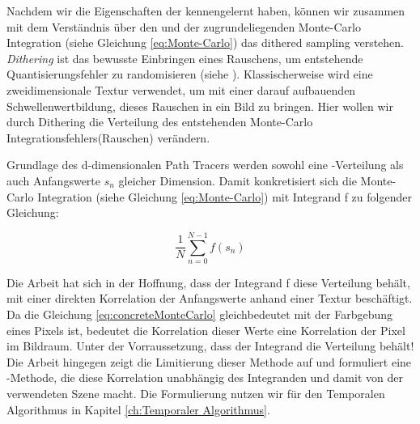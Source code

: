 \label{subsec:dither sampling}
Nachdem wir die Eigenschaften der  kennengelernt haben,
können wir zusammen mit dem Verständnis über den  und der 
zugrundeliegenden Monte-Carlo Integration (siehe Gleichung \ref{eq:Monte-Carlo}) das dithered sampling verstehen.
\textit{Dithering} ist das bewusste Einbringen eines Rauschens, um entstehende Quantisierungsfehler
zu randomisieren (siehe \cite{georgiev2016blue}).
Klassischerweise wird eine zweidimensionale 
 Textur verwendet, um mit einer darauf aufbauenden Schwellenwertbildung,
dieses Rauschen in ein Bild zu bringen. 
Hier wollen wir durch Dithering die Verteilung des 
entstehenden Monte-Carlo Integrationsfehlers(Rauschen) verändern.\par
Grundlage des d-dimensionalen Path Tracers werden sowohl eine 
-Verteilung als auch Anfangswerte $s_{n}$ gleicher Dimension.
Damit konkretisiert sich die Monte-Carlo Integration (siehe Gleichung \ref{eq:Monte-Carlo}) 
mit Integrand f zu folgender Gleichung:

\begin{equation}\label{eq:concreteMonteCarlo}
    \frac{1}{N}\sum_{n=0}^{N-1}f(s_{n})
\end{equation}

Die Arbeit \cite{georgiev2016blue} hat sich in der Hoffnung, dass der Integrand f diese
Verteilung behält, mit einer direkten Korrelation der Anfangswerte anhand einer 
 Textur beschäftigt. Da die Gleichung \ref{eq:concreteMonteCarlo}
gleichbedeutet mit der Farbgebung eines Pixels ist, bedeutet die Korrelation dieser Werte eine Korrelation 
der Pixel im Bildraum. Unter der Vorraussetzung, dass der Integrand die Verteilung behält!
Die Arbeit \cite{hal02158423} hingegen zeigt die Limitierung dieser Methode auf und formuliert 
eine -Methode, 
die diese Korrelation unabhängig des Integranden und damit von der verwendeten Szene macht.
Die Formulierung nutzen wir für den Temporalen Algorithmus in Kapitel \ref{ch:Temporaler Algorithmus}.



